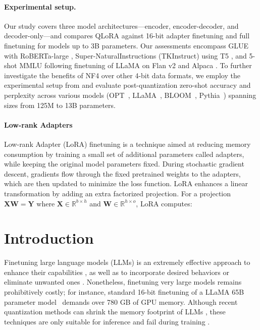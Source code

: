 \paragraph{Experimental setup.} Our study covers three model architectures—encoder, encoder-decoder, and decoder-only—and compares QLoRA against 16-bit adapter finetuning and full finetuning for models up to 3B parameters. Our assessments encompass GLUE \citep{wang2018glue} with RoBERTa-large \citep{liu2019roberta}, Super-NaturalInstructions (TKInstruct) \citep{wang2022super} using T5 \citep{t5}, and 5-shot MMLU \citep{hendrycksmeasuring} following finetuning of LLaMA on Flan v2 \citep{longpre2023flan} and Alpaca \citep{alpaca}. To further investigate the benefits of NF4 over other 4-bit data formats, we employ the experimental setup from \citet{dettmers2022case} and evaluate post-quantization zero-shot accuracy and perplexity across various models (OPT~\citep{zhang2022opt}, LLaMA~\citep{touvron2023llama}, BLOOM~\citep{scao2022bloom}, Pythia~\citep{biderman2023pythia}) spanning sizes from 125M to 13B parameters.

\paragraph{Low-rank Adapters} Low-rank Adapter (LoRA) finetuning \citep{hu2021lora} is a technique aimed at reducing memory consumption by training a small set of additional parameters called adapters, while keeping the original model parameters fixed. During stochastic gradient descent, gradients flow through the fixed pretrained weights to the adapters, which are then updated to minimize the loss function. LoRA enhances a linear transformation by adding an extra factorized projection. For a projection ${\mathbf{X} \mathbf{W} = \mathbf{Y}}$ where $\mathbf{X}\in  \mathbb{R}^{b\times h}$ and $\mathbf{W}\in  \mathbb{R}^{h\times o}$, LoRA computes:

\section{Introduction}

Finetuning large language models (LLMs) is an extremely effective approach to enhance their capabilities \citep{min2021metaicl, wei2021finetuned, ouyang2022training, wang2022super, wang2022self, liu2022few}, as well as to incorporate desired behaviors or eliminate unwanted ones \citep{ouyang2022training, askell2021general, bai2022training}. Nonetheless, finetuning very large models remains prohibitively costly; for instance, standard 16-bit finetuning of a LLaMA 65B parameter model~\citep{touvron2023llama} demands over 780 GB of GPU memory. Although recent quantization methods can shrink the memory footprint of LLMs \citep{dettmers2022llm, dettmers2022case, frantar2022gptq, xiao2022smoothquant}, these techniques are only suitable for inference and fail during training \citep{wortsman2023stable}. 

